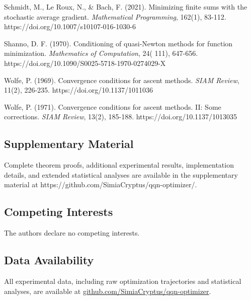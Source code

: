 Schmidt, M., Le Roux, N., \& Bach, F. (2021). Minimizing finite sums with the stochastic average gradient. \emph{Mathematical
Programming}, 162(1), 83-112. https://doi.org/10.1007/s10107-016-1030-6

Shanno, D. F. (1970). Conditioning of quasi-Newton methods for function minimization. \emph{Mathematics of Computation}, 24(
111), 647-656. https://doi.org/10.1090/S0025-5718-1970-0274029-X

Wolfe, P. (1969). Convergence conditions for ascent methods. \emph{SIAM Review}, 11(2),
226-235. https://doi.org/10.1137/1011036

Wolfe, P. (1971). Convergence conditions for ascent methods. II: Some corrections. \emph{SIAM Review}, 13(2),
185-188. https://doi.org/10.1137/1013035

\hypertarget{supplementary-material}{%
\subsection{Supplementary Material}\label{supplementary-material}}

Complete theorem proofs, additional experimental results, implementation details, and extended statistical analyses are
available in the supplementary material at https://github.com/SimiaCryptus/qqn-optimizer/.

\hypertarget{competing-interests}{%
\subsection{Competing Interests}\label{competing-interests}}

The authors declare no competing interests.

\hypertarget{data-availability}{%
\subsection{Data Availability}\label{data-availability}}

All experimental data, including raw optimization trajectories and statistical analyses, are available at \href{https://github.com/SimiaCryptus/qqn-optimizer/}{github.com/SimiaCryptus/qqn-optimizer}.
